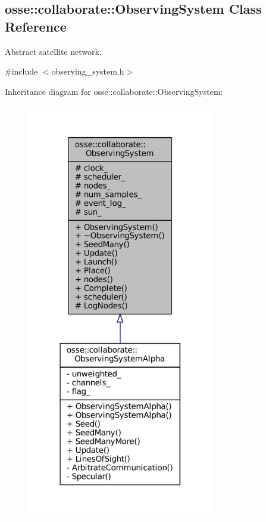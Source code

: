 \hypertarget{classosse_1_1collaborate_1_1_observing_system}{}\subsection{osse\+:\+:collaborate\+:\+:Observing\+System Class Reference}
\label{classosse_1_1collaborate_1_1_observing_system}


Abstract satellite network.  




{\ttfamily \#include $<$observing\+\_\+system.\+h$>$}



Inheritance diagram for osse\+:\+:collaborate\+:\+:Observing\+System\+:
\nopagebreak
\begin{figure}[H]
\begin{center}
\leavevmode
\includegraphics[width=231pt]{classosse_1_1collaborate_1_1_observing_system__inherit__graph}
\end{center}
\end{figure}
